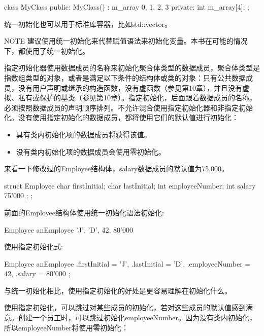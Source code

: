 \begin{cpp}
class MyClass
{
    public:
        MyClass()
            : m_array { 0, 1, 2, 3 }
        {
        }
    private:
        int m_array[4];
};
\end{cpp}

统一初始化也可以用于标准库容器，比如std::vector。

\begin{myNotic}{NOTE}
建议使用统一初始化来代替赋值语法来初始化变量。本书在可能的情况下，都使用了统一初始化。
\end{myNotic}


指定初始化器使用数据成员的名称来初始化聚合体类型的数据成员，聚合体类型是指数组类型的对象，或者是满足以下条件的结构体或类的对象：只有公共数据成员，没有用户声明或继承的构造函数，没有虚函数（参见第10章），并且没有虚拟、私有或保护的基类（参见第10章）。指定初始化，后面跟着数据成员的名称，必须按照数据成员的声明顺序排列。不允许混合使用指定初始化器和非指定初始化。没有使用指定初始化的数据成员，都将使用它们的默认值进行初始化：

\begin{itemize}
\item
具有类内初始化项的数据成员将获得该值。

\item
没有类内初始化项的数据成员会使用零初始化。
\end{itemize}

来看一下修改过的Employee结构体，salary数据成员的默认值为75,000。

\begin{cpp}
struct Employee {
    char firstInitial;
    char lastInitial;
    int employeeNumber;
    int salary { 75'000 };
};
\end{cpp}

前面的Employee结构体使用统一初始化语法初始化:

\begin{cpp}
Employee anEmployee { 'J', 'D', 42, 80'000 }
\end{cpp}

使用指定初始化式:

\begin{cpp}
Employee anEmployee {
    .firstInitial = 'J',
    .lastInitial = 'D',
    .employeeNumber = 42,
    .salary = 80'000
};
\end{cpp}

与统一初始化相比，使用指定初始化的好处是更容易理解在初始化什么。

使用指定初始化，可以跳过对某些成员的初始化，若对这些成员的默认值感到满意。创建一个员工时，可以跳过初始化employeeNumber。因为没有类内初始化，所以employeeNumber将使用零初始化：

